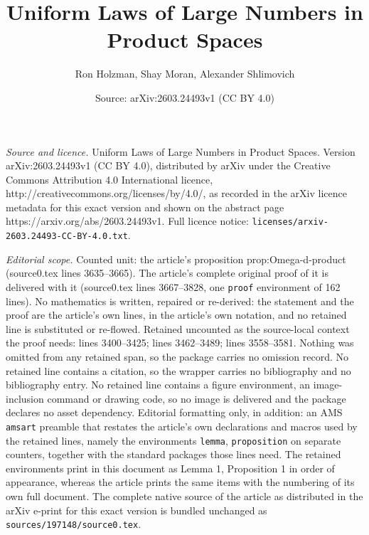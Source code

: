 \documentclass[10pt,a4paper]{amsart}
\title{Uniform Laws of Large Numbers in Product Spaces}
\author{Ron Holzman, Shay Moran, Alexander Shlimovich}
\date{Source: arXiv:2603.24493v1 (CC BY 4.0)}
\begin{document}
\maketitle

\noindent\emph{Source and licence.} Uniform Laws of Large Numbers in Product Spaces. Version arXiv:2603.24493v1 (CC BY 4.0), distributed by arXiv under the Creative Commons Attribution 4.0 International licence, http://creativecommons.org/licenses/by/4.0/, as recorded in the arXiv licence metadata for this exact version and shown on the abstract page https://arxiv.org/abs/2603.24493v1. Full licence notice: \texttt{licenses/arxiv-2603.24493-CC-BY-4.0.txt}.\par\smallskip

\noindent\textit{Editorial scope.} Counted unit: the article's proposition prop:Omega-d-product (source0.tex lines 3635--3665). The article's complete original proof of it is delivered with it (source0.tex lines 3667--3828, one \texttt{proof} environment of 162 lines). No mathematics is written, repaired or re-derived: the statement and the proof are the article's own lines, in the article's own notation, and no retained line is substituted or re-flowed.  Retained uncounted as the source-local context the proof needs: lines 3400--3425; lines 3462--3489; lines 3558--3581.  Nothing was omitted from any retained span, so the package carries no omission record.  No retained line contains a citation, so the wrapper carries no bibliography and no bibliography entry.  No retained line contains a figure environment, an image-inclusion command or drawing code, so no image is delivered and the package declares no asset dependency.  Editorial formatting only, in addition: an AMS \texttt{amsart} preamble that restates the article's own declarations and macros used by the retained lines, namely the environments \texttt{lemma}, \texttt{proposition} on separate counters, together with the standard packages those lines need.  The retained environments print in this document as Lemma 1, Proposition 1 in order of appearance, whereas the article prints the same items with the numbering of its own full document.  The complete native source of the article as distributed in the arXiv e-print for this exact version is bundled unchanged as \texttt{sources/197148/source0.tex}.
\end{document}
